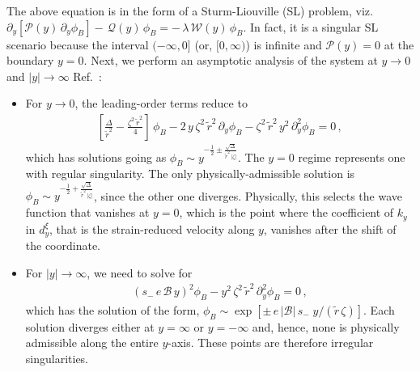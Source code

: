 \documentclass[aps,prb, onecolumn, nofootinbib, citeautoscript,10pt]{revtex4-2}
\def \nn{\nonumber \\}
\begin{document}
\begin{widetext}
The above equation is in the form of a Sturm-Liouville (SL) problem, viz. $\partial_y \left[ \mathcal P (y)\,\partial_y \phi_B \right ] - \, {\mathcal Q} (y)\,\phi_B = -\,\lambda\, {\mathcal W}(y)\,\phi_B $. In fact, it is a singular SL scenario because the interval $(-\infty, 0]$ (or, $ [0, \infty)$) is infinite and ${\mathcal P} (y) = 0$ at the boundary $y= 0$. Next, we perform an asymptotic analysis of the system at $y\rightarrow0$ and $ |y| \rightarrow \infty$ Ref.~\cite{strained-dirac-franz}:
\begin{itemize}
\item For $y\rightarrow0$, the leading-order terms reduce to
\begin{align}
\left[\frac{\Delta}{\tilde{r}^2}-\frac{\zeta^2\,\tilde{r}^2}{4} \right] \, \phi_B 
-2 \,y \, \zeta^2 \, \tilde{r}^2  \, \partial_y \phi_B- \zeta^2 \, \tilde{r}^2 \,y^2 \, \partial^2_y \phi_B=0 \,,
\end{align}
which has solutions going as $\phi_B \sim y^{-\frac{1}{2}\pm{\frac{\sqrt{\Delta}}{\tilde{r}^2 \, |\zeta|}}} $. The $y=0$ regime represents one with regular singularity. The only physically-admissible solution is  $ \phi_B \sim y^{-\frac{1}{2}+{\frac{\sqrt{\Delta}}{\tilde{r}^2 \, |\zeta|}}} $, since the other one diverges. Physically, this selects the wave function that vanishes at $y=0$, which is the point where the coefficient of $k_y$ in $d^\xi_y$, that is the strain-reduced velocity along $y$, vanishes after the shift of the coordinate. 

\item For $ |y| \rightarrow\infty$, we need to solve for
\begin{align}
\left (s_{-}\,e \, {\mathcal B}\,y \right )^2  \phi_B -y^2 \,\zeta^2 \, \tilde{r}^2 \, \partial^2_y \phi_B=0 \, ,
\end{align}
which has the solution of the form, $ \phi_B \sim \exp \left [ {\pm \, e\, |{\mathcal B}|  \,s_- \; y} /(\tilde r \, \zeta) \right ] $. 
Each solution diverges either at $ y = \infty$ or $y=-\infty $ and, hence, none is physically admissible along the entire $y$-axis. These points are therefore irregular singularities.


\end{itemize}
\end{widetext}
\end{document}
